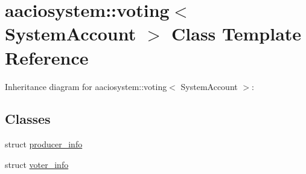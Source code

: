 \hypertarget{classaaciosystem_1_1voting}{}\section{aaciosystem\+:\+:voting$<$ System\+Account $>$ Class Template Reference}
\label{classaaciosystem_1_1voting}


Inheritance diagram for aaciosystem\+:\+:voting$<$ System\+Account $>$\+:
\subsection*{Classes}
\begin{DoxyCompactItemize}
\item 
struct \mbox{\hyperlink{structaaciosystem_1_1voting_1_1producer__info}{producer\+\_\+info}}
\item 
struct \mbox{\hyperlink{structaaciosystem_1_1voting_1_1voter__info}{voter\+\_\+info}}
\end{DoxyCompactItemize}
